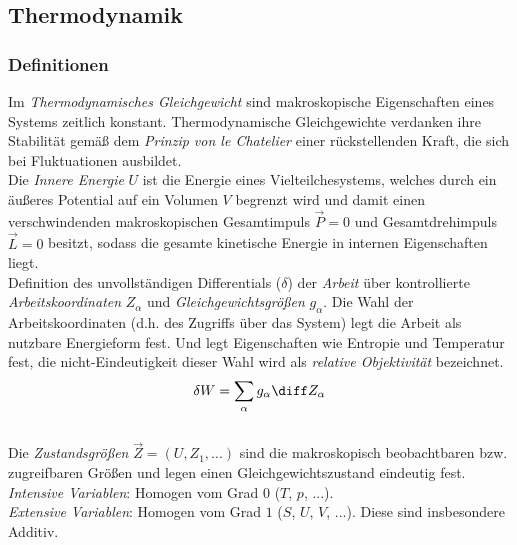 \documentclass[11pt]{article}
\numberwithin{equation}{section}
\begin{document}
    \subsection{Thermodynamik}
      \subsubsection{Definitionen}
        Im \emph{Thermodynamisches Gleichgewicht} sind makroskopische Eigenschaften eines Systems zeitlich konstant. Thermodynamische Gleichgewichte verdanken ihre Stabilität gemäß dem \emph{Prinzip von le Chatelier} einer rückstellenden Kraft, die sich bei Fluktuationen ausbildet. \\

        Die \emph{Innere Energie} $U$ ist die Energie eines Vielteilchesystems, welches durch ein äußeres Potential auf ein Volumen $V$ begrenzt wird und damit einen verschwindenden makroskopischen Gesamtimpuls $\vec{P}=0$ und Gesamtdrehimpuls $\vec{L} = 0$ besitzt, sodass die gesamte kinetische Energie in internen Eigenschaften liegt.\\

        Definition des unvollständigen Differentials ($\delta$) der \emph{Arbeit} über kontrollierte \emph{Arbeitskoordinaten} $Z_\alpha$ und \emph{Gleichgewichtsgrößen} $g_\alpha$. Die Wahl der Arbeitskoordinaten (d.h. des Zugriffs über das System) legt die Arbeit als nutzbare Energieform fest. Und legt Eigenschaften wie Entropie und Temperatur fest, die nicht-Eindeutigkeit dieser Wahl wird als \emph{relative Objektivität} bezeichnet.
        \begin{equation}
          \delta W = \sum_\alpha g_\alpha \diff Z_\alpha
        \end{equation}\\

        Die \emph{Zustandsgrößen} $\vec{Z}=\left(U, Z_1,... \right)$ sind die makroskopisch beobachtbaren bzw. zugreifbaren Größen und legen einen Gleichgewichtszustand eindeutig fest.\\

        \emph{Intensive Variablen}: Homogen vom Grad $0$ ($T$, $p$, ...).\\

        \emph{Extensive Variablen}: Homogen vom Grad $1$ ($S$, $U$, $V$, ...). Diese sind insbesondere Additiv.\\
\end{document}

